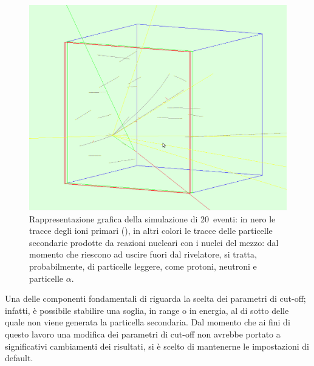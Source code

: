 \begin{figure} [!p]
	\centering
	\includegraphics[width=\textwidth, keepaspectratio]{Grafici/evento5_ritagliato.png}
	\caption{Rappresentazione grafica della simulazione di 20~eventi: in nero le tracce degli ioni primari (), in altri colori le tracce delle particelle secondarie prodotte da reazioni nucleari con i nuclei del mezzo: dal momento che riescono ad uscire fuori dal rivelatore, si tratta, probabilmente, di particelle leggere, come protoni, neutroni e particelle $\alpha$.} \label{fig:simulazione_evento}
\end{figure}




Una delle componenti fondamentali di \geant{} riguarda la scelta dei parametri di cut-off; infatti, è possibile stabilire una soglia, in range o in energia, al di sotto delle quale non viene generata la particella secondaria.
Dal momento che ai fini di questo lavoro una modifica dei parametri di cut-off non avrebbe portato a significativi cambiamenti dei risultati, si è scelto di mantenerne le impostazioni di default.



\subsection{}

